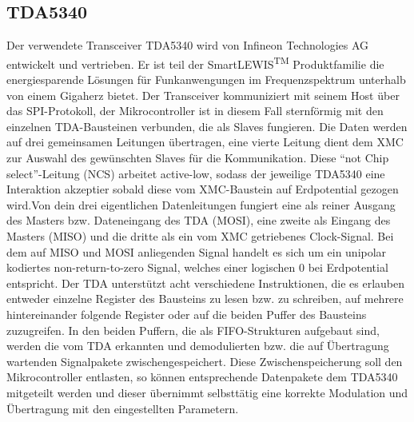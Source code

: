 \subsection{TDA5340}
Der verwendete Transceiver TDA5340 wird von Infineon Technologies AG  entwickelt und vertrieben. Er ist teil der SmartLEWIS\textsuperscript{TM} Produktfamilie die  energiesparende Lösungen für Funkanwengungen im Frequenzspektrum unterhalb von einem Gigaherz bietet. 
Der Transceiver kommuniziert mit seinem Host über das \ac{SPI}-Protokoll, der Mikrocontroller ist in diesem Fall sternförmig mit den einzelnen TDA-Bausteinen verbunden, die als Slaves fungieren. Die Daten werden auf drei gemeinsamen Leitungen übertragen, eine vierte Leitung dient dem XMC zur Auswahl des gewünschten Slaves für die Kommunikation. Diese \enquote{not Chip select}-Leitung (NCS) arbeitet active-low, sodass der jeweilige TDA5340 eine Interaktion akzeptier sobald diese vom XMC-Baustein auf Erdpotential gezogen wird.Von dein drei eigentlichen Datenleitungen fungiert eine als reiner Ausgang des Masters bzw. Dateneingang des TDA (MOSI), eine zweite als Eingang des Masters (MISO) und die dritte als ein vom XMC getriebenes Clock-Signal. Bei dem auf MISO und MOSI anliegenden Signal handelt es sich um ein unipolar kodiertes non-return-to-zero Signal, welches einer logischen $0$ bei Erdpotential entspricht. Der TDA unterstützt acht verschiedene Instruktionen, die es erlauben entweder einzelne Register des Bausteins zu lesen bzw. zu schreiben, auf mehrere hintereinander folgende Register  oder auf die beiden Puffer des Bausteins zuzugreifen. In den beiden Puffern, die als \ac{FIFO}-Strukturen  aufgebaut sind, werden die vom TDA erkannten und demodulierten bzw. die auf Übertragung wartenden Signalpakete zwischengespeichert. Diese Zwischenspeicherung soll den Mikrocontroller entlasten, so können entsprechende Datenpakete dem TDA5340 mitgeteilt werden und dieser übernimmt selbsttätig eine korrekte Modulation und Übertragung mit den eingestellten Parametern. 

